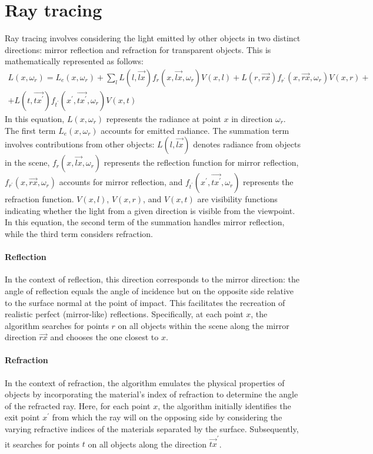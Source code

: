 \section{Ray tracing}

Ray tracing involves considering the light emitted by other objects in two distinct directions: mirror reflection and refraction for transparent objects. 
This is mathematically represented as follows:
\begin{multline*}
    L(x,\omega_r)=L_e(x,\omega_r)+\sum_l L(l,\overrightarrow{lx})f_{r}(x,\overrightarrow{lx},\omega_r)V(x,l)+L(r,\overrightarrow{rx})f_{r^{\prime}}(x,\overrightarrow{rx},\omega_r)V(x,r)+\\+L(t,\overrightarrow{tx^\prime})f_{t^\prime}(x^\prime,\overrightarrow{tx^\prime},\omega_r)V(x,t)
\end{multline*}
In this equation, $L(x,\omega_r)$ represents the radiance at point $x$ in direction $\omega_r$. 
The first term $L_e(x,\omega_r)$ accounts for emitted radiance. 
The summation term involves contributions from other objects: $L(l,\overrightarrow{lx})$ denotes radiance from objects in the scene, $f_{r}(x,\overrightarrow{lx},\omega_r)$ represents the reflection function for mirror reflection, $f_{r^{\prime}}(x,\overrightarrow{rx},\omega_r)$ accounts for mirror reflection, and $f_{t^\prime}(x^\prime,\overrightarrow{tx^\prime},\omega_r)$ represents the refraction function. 
$V(x,l)$, $V(x,r)$, and $V(x,t)$ are visibility functions indicating whether the light from a given direction is visible from the viewpoint.
In this equation, the second term of the summation handles mirror reflection, while the third term considers refraction.

\paragraph*{Reflection}
In the context of reflection, this direction corresponds to the mirror direction: the angle of reflection equals the angle of incidence but on the opposite side relative to the surface normal at the point of impact. 
This facilitates the recreation of realistic perfect (mirror-like) reflections. Specifically, at each point $x$, the algorithm searches for points $r$ on all objects within the scene along the mirror direction $\overrightarrow{rx}$ and chooses the one closest to $x$.

\paragraph*{Refraction}
In the context of refraction, the algorithm emulates the physical properties of objects by incorporating the material's index of refraction to determine the angle of the refracted ray. 
Here, for each point $x$, the algorithm initially identifies the exit point $x^\prime$ from which the ray will on the opposing side by considering the varying refractive indices of the materials separated by the surface.
Subsequently, it searches for points $t$ on all objects along the direction $\overrightarrow{tx}^\prime$. 

